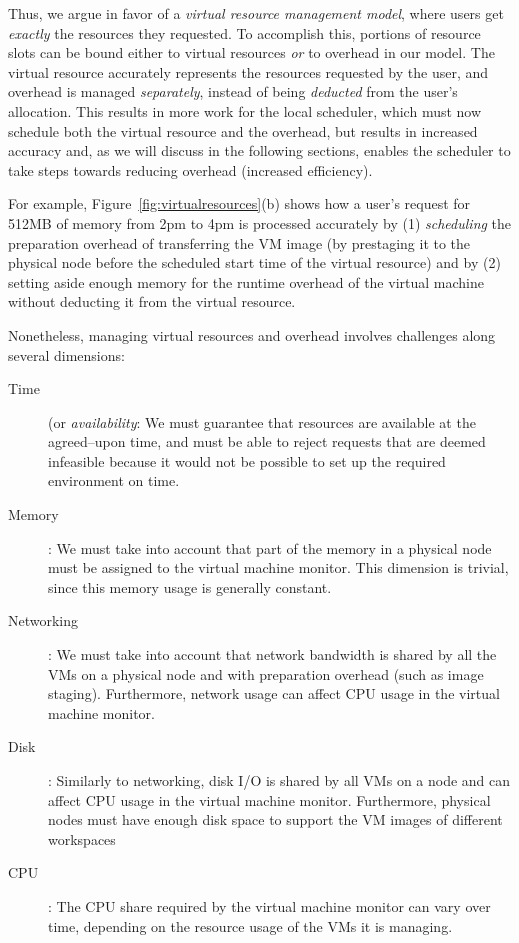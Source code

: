 Thus, we argue in favor of a \emph{virtual resource management model}, where users get \emph{exactly} the resources they requested. To accomplish this, portions of resource slots can be bound either to virtual resources \emph{or}
to overhead in our model. The virtual resource accurately represents the resources requested by the user, and overhead is managed \emph{separately}, instead of being \emph{deducted} from the user's allocation. This results in more work for the local scheduler, which must now schedule both the virtual resource and the overhead, but results in increased accuracy and, as we will discuss in the following sections, enables the scheduler to take steps towards reducing overhead (increased efficiency).

For example, Figure~\ref{fig:virtualresources}(b) shows how a user's request for 512MB of memory from 2pm to 4pm is processed accurately by (1) \emph{scheduling} the preparation overhead of transferring the VM image (by prestaging it to the physical node before the scheduled start time of the virtual resource) and by (2) setting aside enough memory for the runtime overhead of the virtual machine without deducting it from the virtual resource.

Nonetheless, managing virtual resources and overhead involves challenges along several dimensions:

\begin{description}
\item[Time] (or \emph{availability}: We must guarantee that resources are available at the agreed--upon time, and must be able to reject requests that are deemed infeasible because it would not be possible to set up the required environment on time.
\item[Memory]: We must take into account that part of the memory in a physical node must be assigned to the virtual machine monitor. This dimension is trivial, since this memory usage is generally constant.
\item[Networking]: We must take into account that network bandwidth is shared by all the VMs on a physical node and with preparation overhead (such as image staging). Furthermore, network usage can affect CPU usage in the virtual machine monitor.
\item[Disk]: Similarly to networking, disk I/O is shared by all VMs on a node and can affect CPU usage in the virtual machine monitor. Furthermore, physical nodes must have enough disk space to support the VM images of different workspaces
\item[CPU]: The CPU share required by the virtual machine monitor can vary over time, depending on the resource usage of the VMs it is managing.
\end{description}

